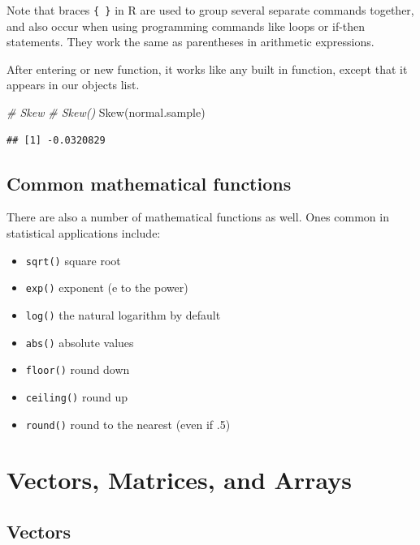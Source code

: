\documentclass[
]{book}
\newenvironment{Shaded}{\begin{snugshade}}{\end{snugshade}}
\newcommand{\CommentTok}[1]{\textcolor[rgb]{0.56,0.35,0.01}{\textit{#1}}}
\newcommand{\FunctionTok}[1]{\textcolor[rgb]{0.00,0.00,0.00}{#1}}
\newcommand{\NormalTok}[1]{#1}
\providecommand{\tightlist}{%
  \setlength{\itemsep}{0pt}\setlength{\parskip}{0pt}}
\begin{document}
Note that braces \texttt{\{\ \}} in R are used to group several separate commands together, and also occur when using programming commands like loops or if-then statements. They work the same as parentheses in arithmetic expressions.

After entering or new function, it works like any built in function, except that it appears in our objects list.

\begin{Shaded}
\begin{Highlighting}[]
\CommentTok{\# Skew}
\CommentTok{\# Skew()}
\FunctionTok{Skew}\NormalTok{(normal.sample)}
\end{Highlighting}
\end{Shaded}

\begin{verbatim}
## [1] -0.0320829
\end{verbatim}

\hypertarget{common-mathematical-functions}{%
\subsection*{Common mathematical functions}\label{common-mathematical-functions}}

There are also a number of mathematical functions as well. Ones common in statistical applications include:

\begin{itemize}
\tightlist
\item
  \texttt{sqrt()} square root
\item
  \texttt{exp()} exponent (e to the power)
\item
  \texttt{log()} the natural logarithm by default
\item
  \texttt{abs()} absolute values
\item
  \texttt{floor()} round down
\item
  \texttt{ceiling()} round up
\item
  \texttt{round()} round to the nearest (even if .5)
\end{itemize}

\hypertarget{vectors-matrices-and-arrays}{%
\section{Vectors, Matrices, and Arrays}\label{vectors-matrices-and-arrays}}

\hypertarget{vectors}{%
\subsection*{Vectors}\label{vectors}}
\end{document}
